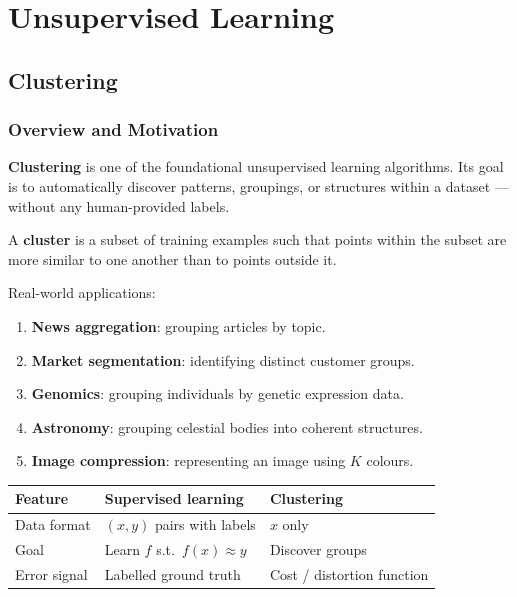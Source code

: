\chapter{Unsupervised Learning}

\section{Clustering}

\subsection{Overview and Motivation}

\textbf{Clustering} is one of the foundational unsupervised learning
algorithms. Its goal is to automatically discover patterns, groupings, or
structures within a dataset --- without any human-provided labels.

\begin{definition}[Cluster]
A \textbf{cluster} is a subset of training examples such that points within
the subset are more similar to one another than to points outside it.
\end{definition}

Real-world applications:
\begin{enumerate}
\item \textbf{News aggregation}: grouping articles by topic.
\item \textbf{Market segmentation}: identifying distinct customer groups.
\item \textbf{Genomics}: grouping individuals by genetic expression data.
\item \textbf{Astronomy}: grouping celestial bodies into coherent structures.
\item \textbf{Image compression}: representing an image using $K$ colours.
\end{enumerate}

\begin{center}
\begin{tabular}{lp{5.2cm}p{5.2cm}}
\toprule
\textbf{Feature} & \textbf{Supervised learning} & \textbf{Clustering}\\
\midrule
Data format    & $(x,y)$ pairs with labels  & $x$ only\\
Goal           & Learn $f$ s.t.\ $f(x)\approx y$ & Discover groups\\
Error signal   & Labelled ground truth      & Cost / distortion function\\
\bottomrule
\end{tabular}
\end{center}

